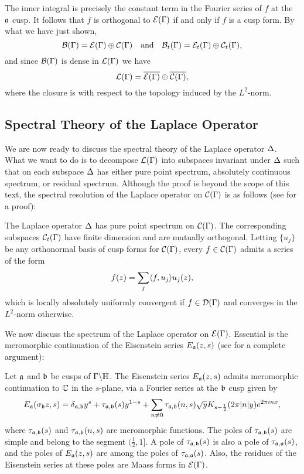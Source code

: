       The inner integral is precisely the constant term in the Fourier series of $f$ at the $\mathfrak{a}$ cusp. It follows that $f$ is orthogonal to $\mathcal{E}(\Gamma)$ if and only if $f$ is a cusp form. By what we have just shown,
      \[
        \mathcal{B}(\Gamma) = \mathcal{E}(\Gamma) \oplus \mathcal{C}(\Gamma) \quad \text{and} \quad \mathcal{B}_{t}(\Gamma) = \mathcal{E}_{t}(\Gamma) \oplus \mathcal{C}_{t}(\Gamma),
      \]
      and since $\mathcal{B}(\Gamma)$ is dense in $\mathcal{L}(\Gamma)$ we have
      \[
        \mathcal{L}(\Gamma) = \overline{\mathcal{E}(\Gamma)} \oplus \overline{\mathcal{C}(\Gamma)},
      \]
      where the closure is with respect to the topology induced by the $L^{2}$-norm.
    \subsection*{Spectral Theory of the Laplace Operator}
      We are now ready to discuss the spectral theory of the Laplace operator $\Delta$. What we want to do is to decompose $\mathcal{L}(\Gamma)$ into subspaces invariant under $\Delta$ such that on each subspace $\Delta$ has either pure point spectrum, absolutely continuous spectrum, or residual spectrum. Although the proof is beyond the scope of this text, the spectral resolution of the Laplace operator on $\mathcal{C}(\Gamma)$ is as follows (see \cite{iwaniec2002spectral} for a proof):

      \begin{theorem}\label{thm:cusp_form_spectrum}
        The Laplace operator $\Delta$ has pure point spectrum on $\mathcal{C}(\Gamma)$. The corresponding subspaces $\mathcal{C}_{t}(\Gamma)$ have finite dimension and are mutually orthogonal. Letting $\{u_{j}\}$ be any orthonormal basis of cusp forms for $\mathcal{C}(\Gamma)$, every $f \in \mathcal{C}(\Gamma)$ admits a series of the form
        \[
          f(z) = \sum_{j}\langle f,u_{j}\rangle u_{j}(z),
        \]
        which is locally absolutely uniformly convergent if $f \in \mathcal{D}(\Gamma)$ and converges in the $L^{2}$-norm otherwise.
      \end{theorem}

      We now discuss the spectrum of the Laplace operator on $\mathcal{E}(\Gamma)$. Essential is the meromorphic continuation of the Eisenstein series $E_{\mathfrak{a}}(z,s)$ (see \cite{iwaniec2002spectral} for a complete argument):

      \begin{theorem}\label{thm:meromorphic_continuation_of_Eisenstein_series}
        Let $\mathfrak{a}$ and $\mathfrak{b}$ be cusps of $\Gamma\backslash\mathbb{H}$. The Eisenstein series $E_{\mathfrak{a}}(z,s)$ admits meromorphic continuation to $\mathbb{C}$ in the $s$-plane, via a Fourier series at the $\mathfrak{b}$ cusp given by
        \[
          E_{\mathfrak{a}}(\sigma_{\mathfrak{b}}z,s) = \delta_{\mathfrak{a},\mathfrak{b}}y^{s}+\tau_{\mathfrak{a},\mathfrak{b}}(s)y^{1-s}+\sum_{n \neq 0}\tau_{\mathfrak{a},\mathfrak{b}}(n,s)\sqrt{y}K_{s-\frac{1}{2}}(2\pi|n|y)e^{2\pi inx},
        \]
        where $\tau_{\mathfrak{a},\mathfrak{b}}(s)$ and $\tau_{\mathfrak{a},\mathfrak{b}}(n,s)$ are meromorphic functions. The poles of $\tau_{\mathfrak{a},\mathfrak{b}}(s)$ are simple and belong to the segment $(\frac{1}{2},1]$. A pole of $\tau_{\mathfrak{a},\mathfrak{b}}(s)$ is also a pole of $\tau_{\mathfrak{a},\mathfrak{a}}(s)$, and the poles of $E_{\mathfrak{a}}(z,s)$ are among the poles of $\tau_{\mathfrak{a},\mathfrak{a}}(s)$. Also, the residues of the Eisenstein series at these poles are Maass forms in $\mathcal{E}(\Gamma)$.
      \end{theorem}

